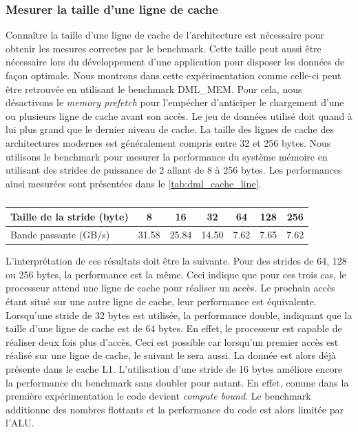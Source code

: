     
    
    \subsubsection{Mesurer la taille d'une ligne de cache}
        Connaître la taille d'une ligne de cache de l'architecture est nécessaire pour obtenir les mesures correctes par le benchmark. Cette taille peut aussi être nécessaire lors du développement d'une application pour disposer les données de façon optimale. Nous montrons dans cette expérimentation comme celle-ci peut être retrouvée en utilisant le benchmark DML\_MEM. Pour cela, nous désactivons le \textit{memory prefetch} pour l'empécher d'anticiper le chargement d'une ou plusieurs ligne de cache avant son accès. Le jeu de données utilisé doit quand à lui plus grand que le dernier niveau de cache. La taille des lignes de cache des architectures modernes est généralement compris entre 32 et 256 bytes. Nous utilisons le benchmark pour mesurer la performance du système mémoire en utilisant des strides de puissance de 2 allant de 8 à 256 bytes. Les performances ainsi mesurées sont présentées dans le \autoref{tab:dml_cache_line}.
    
        \begin{table}[]
        \centering
        \begin{tabular}{|l|c|c|c|c|c|c|}
        \hline
        Taille de la stride (byte) & 8 & 16 & 32 & 64 & 128 & 256 \\ \hline
        Bande passante (GB/s) & 31.58 & 25.84 & 14.50 & 7.62 & 7.65 & 7.62 \\ \hline
        \end{tabular}%
        \caption{}
        \label{tab:dml_cache_line}
        \end{table}
        
         L'interprétation de ces résultats doit être la suivante. Pour des strides de 64, 128 ou 256 bytes, la performance est la même. Ceci indique que pour ces trois cas, le processeur attend une ligne de cache pour réaliser un accès. Le prochain accès étant situé sur une autre ligne de cache, leur performance est équivalente. Lorsqu'une stride de 32 bytes est utilisée, la performance double, indiquant que la taille d'une ligne de cache est de 64 bytes. En effet, le processeur est capable de réaliser deux fois plus d'accès. Ceci est possible car lorsqu'un premier accès est réalisé sur une ligne de cache, le suivant le sera aussi. La donnée est alors déjà présente dans le cache L1. L'utilisation d'une stride de 16 bytes améliore encore la performance du benchmark sans doubler pour autant. En effet, comme dans la première expérimentation le code devient \textit{compute bound}. Le benchmark additionne des nombres flottants et la performance du code est alors limitée par l'ALU. 
    
